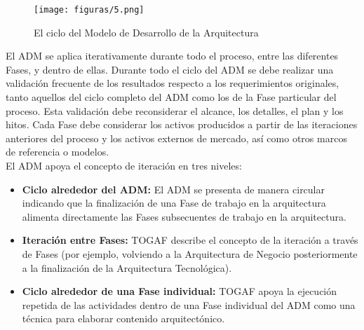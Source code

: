     \begin{figure}[!h]
    	\centering
    	\texttt{[image: figuras/5.png]}
    	\captionsetup{width=.95\textwidth}
    	\caption{El ciclo del Modelo de Desarrollo de la Arquitectura}
    	\label{figura5}
    \end{figure}
    
    El ADM se aplica iterativamente durante todo el proceso, entre las diferentes Fases, y dentro de ellas. Durante todo el ciclo del ADM se debe realizar una validación frecuente de los resultados respecto a los requerimientos originales, tanto aquellos del ciclo completo del ADM como los de la Fase particular del proceso. Esta validación debe reconsiderar el alcance, los detalles, el plan y los hitos. Cada Fase debe considerar los activos producidos a partir de las iteraciones anteriores del proceso y los activos externos de mercado, así como otros marcos de referencia o modelos. \\
    
    El ADM apoya el concepto de iteración en tres niveles:
    \begin{itemize}
    	\item \textbf{Ciclo alrededor del ADM:} El ADM se presenta de manera circular indicando que la finalización de una Fase de trabajo en la arquitectura alimenta directamente las Fases subsecuentes de trabajo en la arquitectura.
    	\item \textbf{Iteración entre Fases:} TOGAF describe el concepto de la iteración a través de Fases (por ejemplo, volviendo a la Arquitectura de Negocio posteriormente a la finalización de la Arquitectura Tecnológica).
    	\item \textbf{Ciclo alrededor de una Fase individual:} TOGAF apoya la ejecución repetida de las actividades dentro de una Fase individual del ADM como una técnica para elaborar contenido arquitectónico.
   \end{itemize}
   
